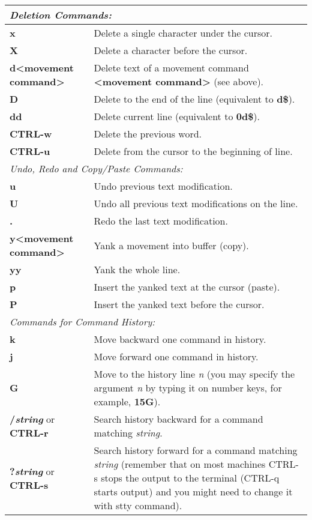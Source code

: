\documentclass{article}
\begin{document}
\mbox{}
\begin{tabular}{|p{4.5cm}|p{13cm}|}
\hline
\multicolumn{2}{|l|}{\small\it{Deletion Commands:}} \\
\hline
\textbf{x} & Delete a single character under the cursor. \\
\hline
\textbf{X} & Delete a character before the cursor. \\
\hline
\textbf{d{\textless}movement command{\textgreater}} & Delete text of a movement command \textbf{{\textless}movement command{\textgreater}} (see above). \\
\hline
\textbf{D} & Delete to the end of the line (equivalent to \textbf{d\$}). \\
\hline
\textbf{dd} & Delete current line (equivalent to \textbf{0d\$}). \\
\hline
\textbf{CTRL-w} & Delete the previous word. \\
\hline
\textbf{CTRL-u} & Delete from the cursor to the beginning of line. \\
\hline
\multicolumn{2}{|l|}{\small\it{Undo, Redo and Copy/Paste Commands:}} \\
\hline
\textbf{u} & Undo previous text modification. \\
\hline
\textbf{U} & Undo all previous text modifications on the line. \\
\hline
\textbf{.} & Redo the last text modification. \\
\hline
\textbf{y{\textless}movement command{\textgreater}} & Yank a movement into buffer (copy). \\
\hline
\textbf{yy} & Yank the whole line. \\
\hline
\textbf{p} & Insert the yanked text at the cursor (paste). \\
\hline
\textbf{P} & Insert the yanked text before the cursor. \\
\hline
\multicolumn{2}{|l|}{\small\it{Commands for Command History:}} \\
\hline
\textbf{k} & Move backward one command in history. \\
\hline
\textbf{j} & Move forward one command in history. \\
\hline
\textbf{G} & Move to the history line \textit{n} (you may specify the argument \textit{n} by typing it on number keys, for example, \textbf{15G}). \\
\hline
\textbf{/\textit{string}} or \textbf{CTRL-r} & Search history backward for a command matching \textit{string}. \\
\hline
\textbf{?\textit{string}} or \textbf{CTRL-s} & Search history forward for a command matching \textit{string} (remember that on most machines CTRL-s stops the output to the terminal (CTRL-q starts output) and you might need to change it with stty command). \\

\end{tabular}
\end{document}
